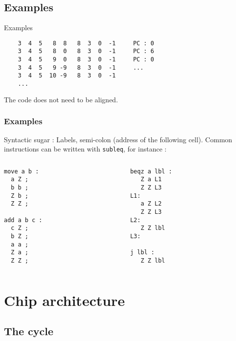 \documentclass{beamer}
\begin{document}
\subsection{Examples}
\begin{frame}[fragile]{Examples}
  \begin{verbatim}
    3  4  5   8  8   8  3  0  -1     PC : 0
    3  4  5   8  0   8  3  0  -1     PC : 6
    3  4  5   9  0   8  3  0  -1     PC : 0
    3  4  5   9 -9   8  3  0  -1     ...
    3  4  5  10 -9   8  3  0  -1
    ...
  \end{verbatim}
  The code does not need to be aligned.
\end{frame}

\begin{frame}[fragile]
    \frametitle{Examples}
Syntactic sugar : Labels, semi-colon (address of the following cell).
Common instructions can be written with \texttt{subleq}, for instance :

\begin{columns}[t]
    \begin{column}[T]{5cm}
\begin{verbatim}
move a b :
  a Z ;
  b b ;
  Z b ;
  Z Z ;

add a b c :
  c Z ;
  b Z ;
  a a ;
  Z a ;
  Z Z ;
\end{verbatim}
    \end{column}
\begin{column}[T]{5cm}
\begin{verbatim}
beqz a lbl :
   Z a L1
   Z Z L3
L1:
   a Z L2
   Z Z L3
L2:
   Z Z lbl
L3:

j lbl :
   Z Z lbl
\end{verbatim}
\end{column}
\end{columns}
\end{frame}

\section{Chip architecture}
\subsection{The cycle}
\end{document}
